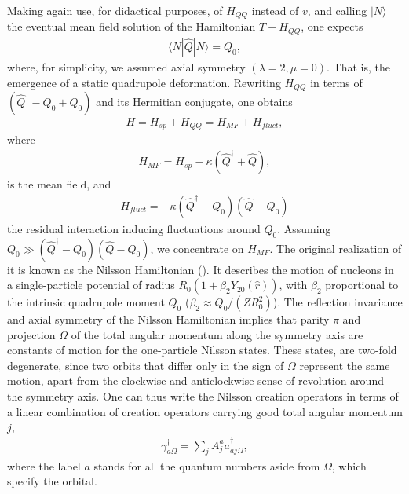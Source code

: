 \documentclass[a4paper,11pt]{book}
\numberwithin{equation}{section}
\numberwithin{figure}{section}
\numberwithin{table}{section}
\newcommand{\braket}[1]{\langle {#1} \rangle }
\newcommand{\ket}[1]{|{#1} \rangle }
\begin{document}
Making again use, for didactical purposes, of $H_{QQ}$ instead of $v$, and calling $\ket{N}$ the eventual mean field solution of the Hamiltonian $T+H_{QQ}$, one expects
  \begin{align}\label{eq0.4.1}
\braket{N|\hat Q|N}=Q_0,
  \end{align}
where, for simplicity, we assumed axial symmetry $(\lambda=2,\mu=0)$. That is, the emergence of a static quadrupole deformation.
Rewriting $H_{QQ}$ in terms of $(\hat Q^\dagger-Q_0+Q_0)$ and its Hermitian conjugate, one obtains 
  \begin{align}\label{eq0.4.2}
H=H_{sp}+H_{QQ}=H_{MF}+H_{fluct},
\end{align}
where 
  \begin{align}\label{eq0.4.3}
H_{MF}=H_{sp}-\kappa(\hat Q^\dagger+\hat Q),
\end{align}
is the mean field, and
\begin{align}\label{eq0.4.4}
H_{fluct}=-\kappa(\hat Q^\dagger-Q_0)(\hat Q-Q_0)
\end{align}
the residual interaction inducing fluctuations around $Q_0$. Assuming $Q_0\gg (\hat Q^\dagger-Q_0)(\hat Q-Q_0)$, we concentrate on $H_{MF}$. The original realization of it is known as the Nilsson Hamiltonian (\cite{Nilsson:55}). It describes the motion of nucleons in a single-particle potential of radius $R_0(1+\beta_2Y_{20}(\hat r))$, with $\beta_2$ proportional to the intrinsic quadrupole moment $Q_0$ ($\beta_2\approx Q_0/(ZR_0^2)$). The reflection invariance and axial symmetry of the Nilsson Hamiltonian implies that parity $\pi$ and projection $\Omega$ of the total angular momentum along the symmetry axis are constants of motion for the one-particle Nilsson states. These states, are two-fold degenerate, since two orbits that differ only in the sign of $\Omega$ represent the same motion, apart from the clockwise and anticlockwise sense of revolution around the symmetry axis. One can thus write the Nilsson creation operators in terms of a linear combination of creation operators carrying good total angular momentum $j$, 
\begin{align}\label{eq0.4.5}
\gamma^\dagger_{a\Omega}=\sum_jA_j^aa^\dagger_{aj\Omega},
\end{align}
where the label $a$ stands for all the quantum numbers aside from $\Omega$, which specify the orbital. 
\end{document}
